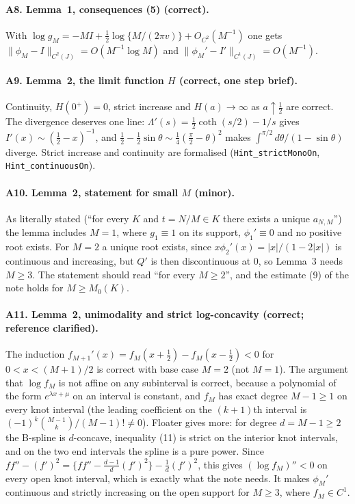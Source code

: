 \documentclass[11pt,a4paper]{article}
\theoremstyle{remark}
\numberwithin{equation}{section}
\begin{document}
\paragraph{A8. Lemma~1, consequences (5) (correct).} With
$\log g_M=-MI+\frac12\log\{M/(2\pi v)\}+O_{C^2}(M^{-1})$ one gets
$\|\phi_M-I\|_{C^2(J)}=O(M^{-1}\log M)$ and $\|\phi_M'-I'\|_{C^1(J)}=O(M^{-1})$.

\paragraph{A9. Lemma~2, the limit function $H$ (correct, one step brief).} Continuity,
$H(0^+)=0$, strict increase and $H(a)\to\infty$ as $a\uparrow\frac12$ are correct. The
divergence deserves one line: $\Lambda'(s)=\frac12\coth(s/2)-1/s$ gives
$I'(x)\sim(\frac12-x)^{-1}$, and $\frac12-\frac12\sin\theta\sim\frac14(\frac\pi2-\theta)^2$
makes $\int^{\pi/2}d\theta/(1-\sin\theta)$ diverge. Strict increase and continuity are
formalised (\texttt{Hint\_strictMonoOn}, \texttt{Hint\_continuousOn}).

\paragraph{A10. Lemma~2, statement for small $M$ (minor).} As literally stated (``for every
$K$ and $t=N/M\in K$ there exists a unique $a_{N,M}$'') the lemma includes $M=1$, where
$g_1\equiv1$ on its support, $\phi_1'\equiv0$ and no positive root exists. For $M=2$ a
unique root exists, since $x\phi_2'(x)=|x|/(1-2|x|)$ is continuous and increasing, but $Q'$
is then discontinuous at $0$, so Lemma~3 needs $M\ge3$. The statement should read
``for every $M\ge2$'', and the estimate (9) of the note holds for $M\ge M_0(K)$.

\paragraph{A11. Lemma~2, unimodality and strict log-concavity (correct; reference
clarified).} The induction $f_{M+1}'(x)=f_M(x+\frac12)-f_M(x-\frac12)<0$ for
$0<x<(M+1)/2$ is correct with base case $M=2$ (not $M=1$). The argument that $\log f_M$ is
not affine on any subinterval is correct, because a polynomial of the form
$e^{\lambda x+\mu}$ on an interval is constant, and $f_M$ has exact degree $M-1\ge1$ on every
knot interval (the leading coefficient on the $(k+1)$th interval is
$(-1)^k\binom{M-1}{k}/(M-1)!\neq0$). Floater \cite[Lemma~2, (11) and the discussion after
it]{floater2024} gives more: for degree $d=M-1\ge2$ the B-spline is $d$-concave, inequality
(11) is strict on the interior knot intervals, and on the two end intervals the spline is a
pure power. Since $ff''-(f')^2=\{ff''-\frac{d-1}{d}(f')^2\}-\frac1d(f')^2$, this gives
$(\log f_M)''<0$ on every open knot interval, which is exactly what the note needs. It
makes $\phi_M'$ continuous and strictly increasing on the open support for $M\ge3$, where
$f_M\in C^1$.
\end{document}
